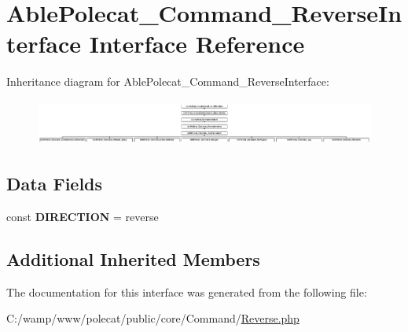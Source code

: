 \hypertarget{interface_able_polecat___command___reverse_interface}{}\section{Able\+Polecat\+\_\+\+Command\+\_\+\+Reverse\+Interface Interface Reference}
\label{interface_able_polecat___command___reverse_interface}
Inheritance diagram for Able\+Polecat\+\_\+\+Command\+\_\+\+Reverse\+Interface\+:\begin{figure}[H]
\begin{center}
\leavevmode
\includegraphics[height=1.514196cm]{interface_able_polecat___command___reverse_interface}
\end{center}
\end{figure}
\subsection*{Data Fields}
\begin{DoxyCompactItemize}
\item 
\hypertarget{interface_able_polecat___command___reverse_interface_ad3beabcf9bd583f082d33e2971b96b3d}{}const {\bfseries D\+I\+R\+E\+C\+T\+I\+O\+N} = \textquotesingle{}reverse\textquotesingle{}\label{interface_able_polecat___command___reverse_interface_ad3beabcf9bd583f082d33e2971b96b3d}

\end{DoxyCompactItemize}
\subsection*{Additional Inherited Members}


The documentation for this interface was generated from the following file\+:\begin{DoxyCompactItemize}
\item 
C\+:/wamp/www/polecat/public/core/\+Command/\hyperlink{_reverse_8php}{Reverse.\+php}\end{DoxyCompactItemize}
